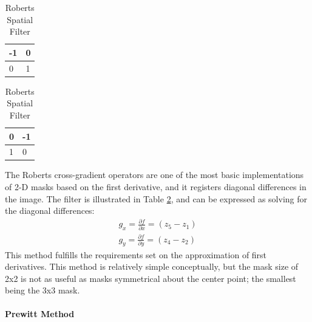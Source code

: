 \begin{table}[h]
\centering
\caption{Roberts Spatial Filter}
\begin{tabular}{|l|l|}
\hline
-1 & 0 \\ \hline
0  & 1 \\ \hline
\end{tabular}
\quad
\begin{tabular}{|l|l|}
\hline
0 & -1 \\ \hline
1 & 0 \\ \hline
\end{tabular}
\label{roberts}
\end{table}
The Roberts cross-gradient operators are one of the most basic implementations of 2-D masks based on the first derivative, and it registers diagonal differences in the image. The filter is illustrated in Table \ref{roberts}, and can be expressed as solving for the diagonal differences:
\begin{align*}
g_x = \frac{\partial f}{\partial x} = (z_5-z_1)\\
g_y = \frac{\partial f}{\partial y} = (z_4 - z_2)
\end{align*}
This method fulfills the requirements set on the approximation of first derivatives. This method is relatively simple conceptually, but the mask size of 2x2 is not as useful as masks symmetrical about the center point; the smallest being the 3x3 mask. 

\paragraph{Prewitt Method}

